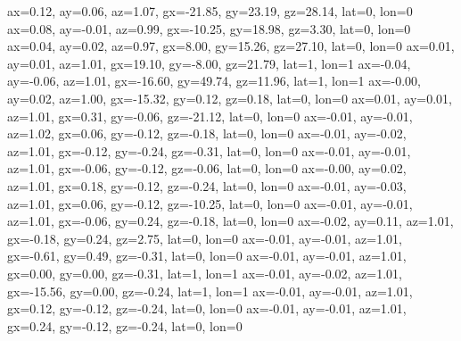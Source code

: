 ax=0.12, ay=0.06, az=1.07, gx=-21.85, gy=23.19, gz=28.14, lat=0, lon=0
ax=0.08, ay=-0.01, az=0.99, gx=-10.25, gy=18.98, gz=3.30, lat=0, lon=0
ax=0.04, ay=0.02, az=0.97, gx=8.00, gy=15.26, gz=27.10, lat=0, lon=0
ax=0.01, ay=0.01, az=1.01, gx=19.10, gy=-8.00, gz=21.79, lat=1, lon=1
ax=-0.04, ay=-0.06, az=1.01, gx=-16.60, gy=49.74, gz=11.96, lat=1, lon=1
ax=-0.00, ay=0.02, az=1.00, gx=-15.32, gy=0.12, gz=0.18, lat=0, lon=0
ax=0.01, ay=0.01, az=1.01, gx=0.31, gy=-0.06, gz=-21.12, lat=0, lon=0
ax=-0.01, ay=-0.01, az=1.02, gx=0.06, gy=-0.12, gz=-0.18, lat=0, lon=0
ax=-0.01, ay=-0.02, az=1.01, gx=-0.12, gy=-0.24, gz=-0.31, lat=0, lon=0
ax=-0.01, ay=-0.01, az=1.01, gx=-0.06, gy=-0.12, gz=-0.06, lat=0, lon=0
ax=-0.00, ay=0.02, az=1.01, gx=0.18, gy=-0.12, gz=-0.24, lat=0, lon=0
ax=-0.01, ay=-0.03, az=1.01, gx=0.06, gy=-0.12, gz=-10.25, lat=0, lon=0
ax=-0.01, ay=-0.01, az=1.01, gx=-0.06, gy=0.24, gz=-0.18, lat=0, lon=0
ax=-0.02, ay=0.11, az=1.01, gx=-0.18, gy=0.24, gz=2.75, lat=0, lon=0
ax=-0.01, ay=-0.01, az=1.01, gx=-0.61, gy=0.49, gz=-0.31, lat=0, lon=0
ax=-0.01, ay=-0.01, az=1.01, gx=0.00, gy=0.00, gz=-0.31, lat=1, lon=1
ax=-0.01, ay=-0.02, az=1.01, gx=-15.56, gy=0.00, gz=-0.24, lat=1, lon=1
ax=-0.01, ay=-0.01, az=1.01, gx=0.12, gy=-0.12, gz=-0.24, lat=0, lon=0
ax=-0.01, ay=-0.01, az=1.01, gx=0.24, gy=-0.12, gz=-0.24, lat=0, lon=0
